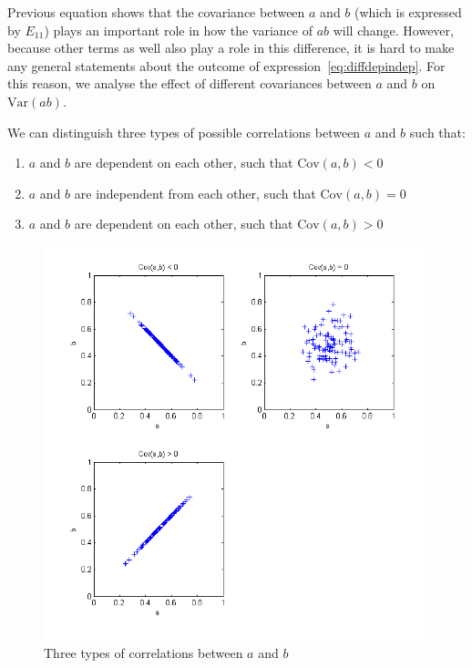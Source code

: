 Previous equation shows that the covariance between $a$ and $b$ (which is expressed by $E_{11}$) plays an important role in how the variance of $ab$ will change. However, because other terms as well also play a role in this difference, it is hard to make any general statements about the outcome of expression~\ref{eq:diffdepindep}. For this reason, we analyse the effect of different covariances between $a$ and $b$ on $\mbox{Var}(ab)$.






\newpage
We can distinguish three types of possible correlations between $a$ and $b$ such that:

\begin{enumerate}
\item $a$ and $b$ are dependent on each other, such that $\mbox{Cov}(a,b) < 0$
\item $a$ and $b$ are independent from each other, such that $\mbox{Cov}(a,b) = 0$
\item $a$ and $b$ are dependent on each other, such that $\mbox{Cov}(a,b) > 0$
\end{enumerate}

\begin{figure}[htp]
\centering
\includegraphics[scale=0.60]{img/correlations.png}
\caption{Three types of correlations between $a$ and $b$}
\end{figure}

